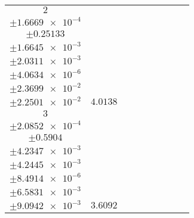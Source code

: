 \documentclass[8pt]{article}
\begin{document}
\begin{longtable}[l]{c c c c c c c c c}
$\num{2}$ & \begin{tabular}[c]{@{}c@{}}$\num{2.9835e-2}$ \\ $\pm\num{1.6669e-4}$\end{tabular} & \begin{tabular}[c]{@{}c@{}}$\num{-0.42154}$ \\ $\pm\num{0.25133}$\end{tabular} & \begin{tabular}[c]{@{}c@{}}$\num{-7.4032}$ \\ $\pm\num{1.6645e-3}$\end{tabular} & \begin{tabular}[c]{@{}c@{}}$\num{723.18}$ \\ $\pm\num{2.0311e-3}$\end{tabular} & \begin{tabular}[c]{@{}c@{}}$\num{1.4468}$ \\ $\pm\num{4.0634e-6}$\end{tabular} & \begin{tabular}[c]{@{}c@{}}$\num{3.6166}$ \\ $\pm\num{2.3699e-2}$\end{tabular} & \begin{tabular}[c]{@{}c@{}}$\num{3.4463}$ \\ $\pm\num{2.2501e-2}$\end{tabular} & $\num{4.0138}$\\
$\num{3}$ & \begin{tabular}[c]{@{}c@{}}$\num{2.6458e-2}$ \\ $\pm\num{2.0852e-4}$\end{tabular} & \begin{tabular}[c]{@{}c@{}}$\num{-0.48913}$ \\ $\pm\num{0.5904}$\end{tabular} & \begin{tabular}[c]{@{}c@{}}$\num{-6.9394}$ \\ $\pm\num{4.2347e-3}$\end{tabular} & \begin{tabular}[c]{@{}c@{}}$\num{723.65}$ \\ $\pm\num{4.2445e-3}$\end{tabular} & \begin{tabular}[c]{@{}c@{}}$\num{1.4477}$ \\ $\pm\num{8.4914e-6}$\end{tabular} & \begin{tabular}[c]{@{}c@{}}$\num{3.5163}$ \\ $\pm\num{6.5831e-3}$\end{tabular} & \begin{tabular}[c]{@{}c@{}}$\num{3.4638}$ \\ $\pm\num{9.0942e-3}$\end{tabular} & $\num{3.6092}$\\

\end{longtable}
\end{document}
